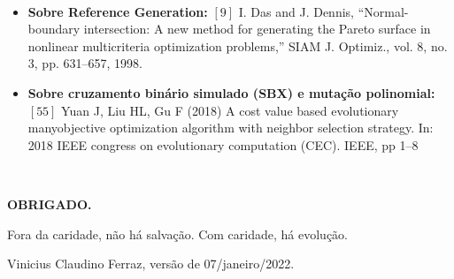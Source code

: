 \documentclass{rbfin}
\begin{document}
\newpage

$\,$

\vspace{60mm}

\begin{itemize}
  \item \textbf{Sobre Reference Generation:} $[9]$ I. Das and J. Dennis, “Normal-boundary intersection: A new method for generating the Pareto surface in nonlinear multicriteria optimization problems,” SIAM J. Optimiz., vol. 8, no. 3, pp. 631–657, 1998.
  \item \textbf{Sobre cruzamento binário simulado (SBX) e mutação polinomial:} $[55]$ Yuan J, Liu HL, Gu F (2018) A cost value based evolutionary manyobjective optimization algorithm with neighbor selection strategy. In: 2018 IEEE congress on evolutionary computation (CEC). IEEE, pp 1–8
\end{itemize}

\newpage

\Huge

\onehalfspacing

$\,$

\vspace{70mm}

\begin{center}
\textbf{OBRIGADO.}
\end{center}

\vspace{70mm}

\normalsize

Fora da caridade, não há salvação. Com caridade, há evolução.

Vinicius Claudino Ferraz, versão de 07/janeiro/2022.
\end{document}
